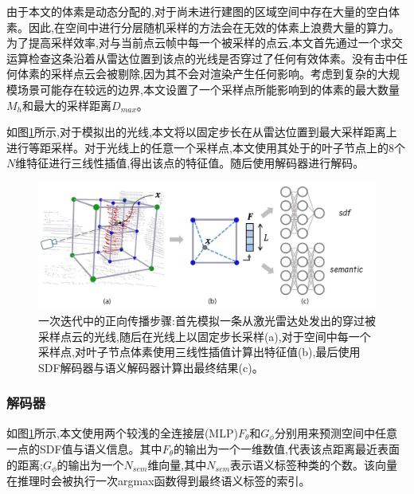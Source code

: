 由于本文的体素是动态分配的,对于尚未进行建图的区域空间中存在大量的空白体素。因此,在空间中进行分层随机采样的方法会在无效的体素上浪费大量的算力。为了提高采样效率,对与当前点云帧中每一个被采样的点云,本文首先通过一个求交运算检查这条沿着从雷达位置到该点的光线是否穿过了任何有效体素。没有击中任何体素的采样点云会被剔除,因为其不会对渲染产生任何影响。考虑到复杂的大规模场景可能存在较远的边界,本文设置了一个采样点所能影响到的体素的最大数量$M_h$和最大的采样距离$D_{max}$。

如图\ref{shinemapping}所示,对于模拟出的光线,本文将以固定步长在从雷达位置到最大采样距离上进行等距采样。对于光线上的任意一个采样点,本文使用其处于的叶子节点上的8个$N$维特征进行三线性插值,得出该点的特征值。随后使用解码器进行解码。
\begin{figure}[htbp]
    \includegraphics[scale = 0.3]{figures/shinemapping.png}
    \centering
    \caption{一次迭代中的正向传播步骤:首先模拟一条从激光雷达处发出的穿过被采样点云的光线,随后在光线上以固定步长采样(a),对于空间中每一个采样点,对叶子节点体素使用三线性插值计算出特征值(b),最后使用SDF解码器与语义解码器计算出最终结果(c)。}\label{shinemapping}
\end{figure}
\subsubsection{解码器}
如图\ref{shinemapping}所示,本文使用两个较浅的全连接层(MLP)$F_\theta$和$G_\phi$分别用来预测空间中任意一点的SDF值与语义信息。其中$F_\theta$的输出为一个一维数值,代表该点距离最近表面的距离;$G_\phi$的输出为一个$N_{sem}$维向量,其中$N_{sem}$表示语义标签种类的个数。该向量在推理时会被执行一次argmax函数得到最终语义标签的索引。
